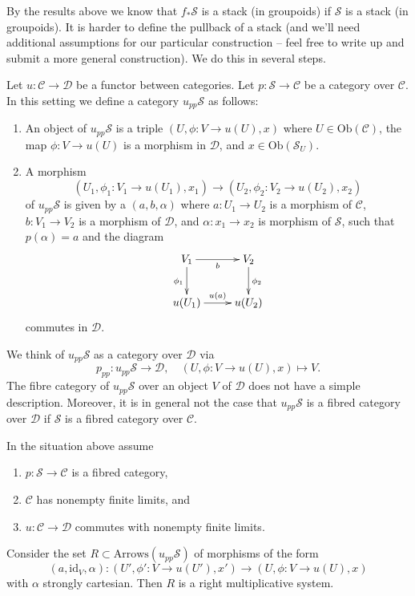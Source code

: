 \noindent
By the results above we know that $f_*\mathcal{S}$ is a stack (in groupoids)
if $\mathcal{S}$ is a stack (in groupoids).
It is harder to define the pullback of a stack (and we'll need additional
assumptions for our particular construction -- feel free to write up and
submit a more general construction). We do this in several steps.

\medskip\noindent
Let $u : \mathcal{C} \to \mathcal{D}$ be a functor between categories.
Let $p : \mathcal{S} \to \mathcal{C}$ be a category over $\mathcal{C}$.
In this setting we define a category $u_{pp}\mathcal{S}$ as follows:
\begin{enumerate}
\item An object of $u_{pp}\mathcal{S}$ is a triple
$(U, \phi : V \to u(U), x)$ where $U \in \text{Ob}(\mathcal{C})$,
the map $\phi : V \to u(U)$ is a morphism in $\mathcal{D}$,
and $x \in \text{Ob}(\mathcal{S}_U)$.
\item A morphism
$$
(U_1, \phi_1 : V_1 \to u(U_1), x_1)
\longrightarrow
(U_2, \phi_2 : V_2 \to u(U_2), x_2)
$$
of $u_{pp}\mathcal{S}$ is given by a
$(a, b, \alpha)$ where $a : U_1 \to U_2$ is a morphism of $\mathcal{C}$,
$b : V_1 \to V_2$ is a morphism of $\mathcal{D}$, and
$\alpha : x_1 \to x_2$ is morphism of $\mathcal{S}$,
such that $p(\alpha) = a$ and the diagram
$$
\xymatrix{
V_1 \ar[d]_{\phi_1} \ar[r]_b & V_2 \ar[d]^{\phi_2} \\
u(U_1) \ar[r]^{u(a)} & u(U_2)
}
$$
commutes in $\mathcal{D}$.
\end{enumerate}
We think of $u_{pp}\mathcal{S}$ as a category over $\mathcal{D}$ via
$$
p_{pp} : u_{pp}\mathcal{S} \longrightarrow \mathcal{D},
\quad
(U, \phi : V \to u(U), x) \longmapsto V.
$$
The fibre category of $u_{pp}\mathcal{S}$ over an object $V$ of $\mathcal{D}$
does not have a simple description. Moreover, it is in general not the case
that $u_{pp}\mathcal{S}$ is a fibred category over $\mathcal{D}$ if
$\mathcal{S}$ is a fibred category over $\mathcal{C}$.

\begin{lemma}
\label{lemma-right-multiplicative-system}
In the situation above assume
\begin{enumerate}
\item $p : \mathcal{S} \to \mathcal{C}$ is a fibred category,
\item $\mathcal{C}$ has nonempty finite limits, and
\item $u : \mathcal{C} \to \mathcal{D}$ commutes with nonempty finite limits.
\end{enumerate}
Consider the set $R \subset \text{Arrows}(u_{pp}\mathcal{S})$ of morphisms
of the form
$$
(a, \text{id}_V, \alpha) :
(U', \phi' : V \to u(U'), x')
\longrightarrow
(U, \phi : V \to u(U), x)
$$
with $\alpha$ strongly cartesian. Then $R$ is a right multiplicative system.
\end{lemma}


